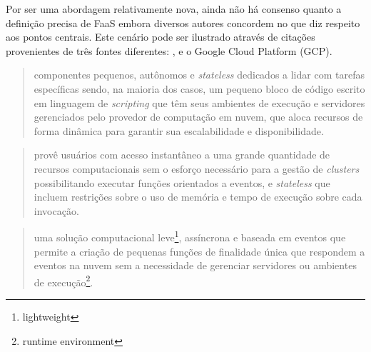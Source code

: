 \documentclass[english,brazilian]{UNISINOSmonografia} %
\begin{document}
Por ser uma abordagem relativamente nova, ainda não há consenso quanto a definição precisa de FaaS embora diversos autores concordem no que diz respeito aos pontos centrais.
Este cenário pode ser ilustrado através de citações provenientes de três fontes diferentes: ,  e o Google Cloud Platform (GCP).
\begin{quote}
	componentes pequenos, autônomos e \textit{stateless} dedicados a lidar com tarefas específicas sendo, na maioria dos casos, um pequeno bloco de código escrito em linguagem de \textit{scripting} que têm seus ambientes de execução e servidores gerenciados pelo provedor de computação em nuvem, que aloca recursos de forma dinâmica para garantir sua escalabilidade e disponibilidade.
	\cite{Wang2018}
\end{quote}
\begin{quote}
	provê usuários com acesso instantâneo a uma grande quantidade de recursos computacionais sem o esforço necessário para a gestão de \textit{clusters} possibilitando executar funções orientados a eventos, e \textit{stateless} que incluem restrições sobre o uso de memória e tempo de execução sobre cada invocação.
	\cite{Shankar2018}
\end{quote}
\begin{quote}
	uma solução computacional leve\footnote{lightweight}, assíncrona e baseada em eventos que permite a criação de pequenas funções de finalidade única que respondem a eventos na nuvem sem a necessidade de gerenciar servidores ou ambientes de execução\footnote{runtime environment}.
	\cite{GCP-FaaS}
	
\end{quote}
\end{document}
